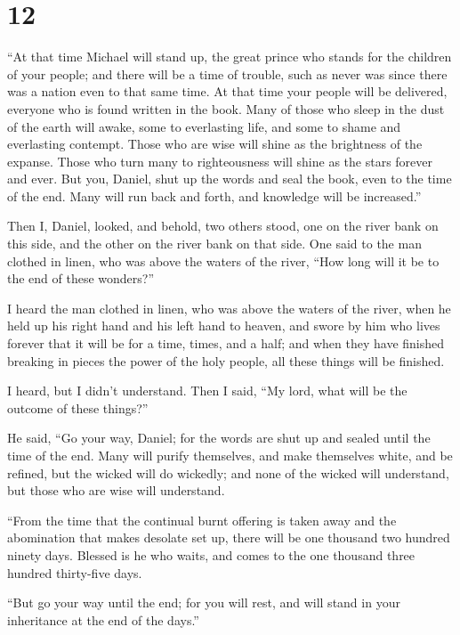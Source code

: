 \hypertarget{section-11}{%
\section{12}\label{section-11}}

 ``At that time Michael will stand up, the great prince
who stands for the children of your people; and there will be a time of
trouble, such as never was since there was a nation even to that same
time. At that time your people will be delivered, everyone who is found
written in the book.  Many of those who sleep in the dust
of the earth will awake, some to everlasting life, and some to shame and
everlasting contempt.  Those who are wise will shine as
the brightness of the expanse. Those who turn many to righteousness will
shine as the stars forever and ever.  But you, Daniel,
shut up the words and seal the book, even to the time of the end. Many
will run back and forth, and knowledge will be increased.''

 Then I, Daniel, looked, and behold, two others stood, one
on the river bank on this side, and the other on the river bank on that
side.  One said to the man clothed in linen, who was above
the waters of the river, ``How long will it be to the end of these
wonders?''

 I heard the man clothed in linen, who was above the
waters of the river, when he held up his right hand and his left hand to
heaven, and swore by him who lives forever that it will be for a time,
times, and a half; and when they have finished breaking in pieces the
power of the holy people, all these things will be finished.

 I heard, but I didn't understand. Then I said, ``My lord,
what will be the outcome of these things?''

 He said, ``Go your way, Daniel; for the words are shut up
and sealed until the time of the end.  Many will purify
themselves, and make themselves white, and be refined, but the wicked
will do wickedly; and none of the wicked will understand, but those who
are wise will understand.

 ``From the time that the continual burnt offering is
taken away and the abomination that makes desolate set up, there will be
one thousand two hundred ninety days.  Blessed is he who
waits, and comes to the one thousand three hundred thirty-five days.

 ``But go your way until the end; for you will rest, and
will stand in your inheritance at the end of the days.''
